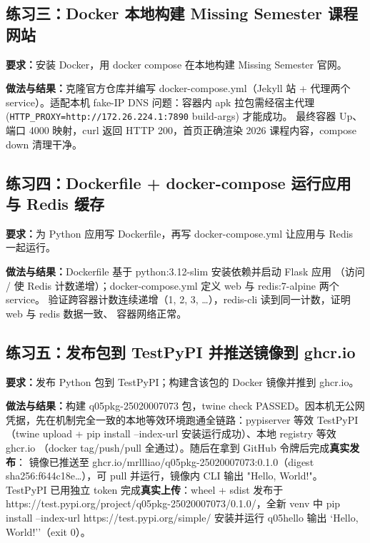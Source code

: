 \documentclass[UTF8]{ctexart}
\begin{document}
\subsection{练习三：Docker 本地构建 Missing Semester 课程网站}

\noindent\textbf{要求：}安装 Docker，用 docker compose 在本地构建 Missing Semester 官网。

\noindent\textbf{做法与结果：}克隆官方仓库并编写 docker-compose.yml（Jekyll 站 + 代理两个
service）。适配本机 fake-IP DNS 问题：容器内 apk 拉包需经宿主代理
(\texttt{HTTP\_PROXY=http://172.26.224.1:7890} build-args) 才能成功。
最终容器 Up、端口 4000 映射，curl 返回 HTTP 200，首页正确渲染 2026 课程内容，compose down 清理干净。

\subsection{练习四：Dockerfile + docker-compose 运行应用与 Redis 缓存}

\noindent\textbf{要求：}为 Python 应用写 Dockerfile，再写 docker-compose.yml 让应用与 Redis 一起运行。

\noindent\textbf{做法与结果：}Dockerfile 基于 python:3.12-slim 安装依赖并启动 Flask 应用
（访问 / 使 Redis 计数递增）；docker-compose.yml 定义 web 与 redis:7-alpine 两个 service。
验证跨容器计数连续递增（1, 2, 3, \ldots），redis-cli 读到同一计数，证明 web 与 redis 数据一致、
容器网络正常。

\subsection{练习五：发布包到 TestPyPI 并推送镜像到 ghcr.io}

\noindent\textbf{要求：}发布 Python 包到 TestPyPI；构建含该包的 Docker 镜像并推到 ghcr.io。

\noindent\textbf{做法与结果：}构建 q05pkg-25020007073 包，twine check PASSED。因本机无公网
凭据，先在机制完全一致的本地等效环境跑通全链路：pypiserver 等效 TestPyPI
（twine upload + pip install --index-url 安装运行成功）、本地 registry 等效 ghcr.io
（docker tag/push/pull 全通过）。随后在拿到 GitHub 令牌后完成\textbf{真实发布}：
镜像已推送至 ghcr.io/mrllliao/q05pkg-25020007073:0.1.0（digest
sha256:f644c18e\ldots），可 pull 并运行，镜像内 CLI 输出 "Hello, World!"。
TestPyPI 已用独立 token 完成\textbf{真实上传}：wheel + sdist 发布于 https://test.pypi.org/project/q05pkg-25020007073/0.1.0/，全新 venv 中 pip install --index-url https://test.pypi.org/simple/ 安装并运行 q05hello 输出 `Hello, World!''（exit 0）。
\end{document}
